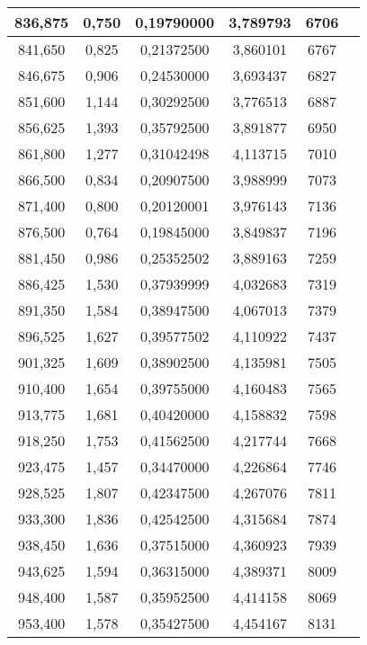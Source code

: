 \documentclass[a4paper,12pt]{article}
\numberwithin{equation}{section}
\begin{document}
\begin{appendices}
\begin{longtable}[c]{|c|c|c|c|c|c|}
836,875	&	 		0,750	&	 		0,19790000		 	&	3,789793	&	 		6706		\\\hline
841,650	&	 		0,825	&	 		0,21372500		 	&	3,860101	&	 		6767		\\\hline
846,675	&	 		0,906	&	 		0,24530000		 	&	3,693437	&	 		6827		\\\hline
851,600	&	 		1,144	&	 		0,30292500		 	&	3,776513	&	 		6887		\\\hline
856,625	&	 		1,393	&	 		0,35792500		 	&	3,891877	&	 		6950		\\\hline
861,800	&	 		1,277	&	 		0,31042498		 	&	4,113715	&	 		7010		\\\hline
866,500	&	 		0,834	&	 		0,20907500		 	&	3,988999	&	 		7073		\\\hline
871,400	&	 		0,800	&	 		0,20120001		 	&	3,976143	&	 		7136		\\\hline
876,500	&	 		0,764	&	 		0,19845000		 	&	3,849837	&	 		7196		\\\hline
881,450	&	 		0,986	&	 		0,25352502		 	&	3,889163	&	 		7259		\\\hline
886,425	&	 		1,530	&	 		0,37939999		 	&	4,032683	&	 		7319		\\\hline
891,350	&	 		1,584	&	 		0,38947500		 	&	4,067013	&	 		7379		\\\hline
896,525	&	 		1,627	&	 		0,39577502		 	&	4,110922	&	 		7437		\\\hline
901,325	&	 		1,609	&	 		0,38902500		 	&	4,135981	&	 		7505		\\\hline
910,400	&	 		1,654	&	 		0,39755000		 	&	4,160483	&	 		7565		\\\hline
913,775	&	 		1,681	&	 		0,40420000		 	&	4,158832	&	 		7598		\\\hline
918,250	&	 		1,753	&	 		0,41562500		 	&	4,217744	&	 		7668		\\\hline
923,475	&	 		1,457	&	 		0,34470000		 	&	4,226864	&	 		7746		\\\hline
928,525	&	 		1,807	&	 		0,42347500		 	&	4,267076	&	 		7811		\\\hline
933,300	&	 		1,836	&	 		0,42542500		 	&	4,315684	&	 		7874		\\\hline
938,450	&	 		1,636	&	 		0,37515000		 	&	4,360923	&	 		7939		\\\hline
943,625	&	 		1,594	&	 		0,36315000		 	&	4,389371	&	 		8009		\\\hline
948,400	&	 		1,587	&	 		0,35952500		 	&	4,414158	&	 		8069		\\\hline
953,400	&	 		1,578	&	 		0,35427500		 	&	4,454167	&	 		8131		\\\hline

\end{longtable}
\end{appendices}
\end{document}
